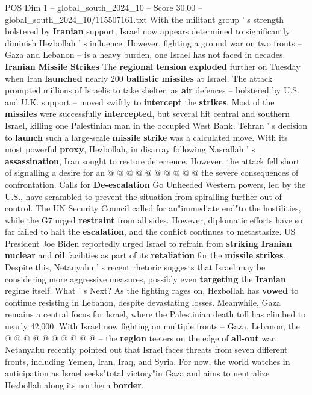 \begin{textsample}{POS Dim 1 – global\_south\_2024\_10 – Score 30.00 – global\_south\_2024\_10/115507161.txt}
With the militant group ' s strength bolstered by \textbf{Iranian} support, Israel now appears determined to significantly diminish Hezbollah ' s influence.
However, fighting a ground war on two fronts -- Gaza and Lebanon -- is a heavy burden, one Israel has not faced in decades. \textbf{Iranian} \textbf{Missile} \textbf{Strikes} The \textbf{regional} \textbf{tension} \textbf{exploded} further on Tuesday when Iran \textbf{launched} nearly 200 \textbf{ballistic} \textbf{missiles} at Israel.
The attack prompted millions of Israelis to take shelter, as \textbf{air} defences -- bolstered by U.S. and U.K. support -- moved swiftly to \textbf{intercept} the \textbf{strikes}.
Most of the \textbf{missiles} were successfully \textbf{intercepted}, but several hit central and southern Israel, killing one Palestinian man in the occupied West Bank.
Tehran ' s decision to \textbf{launch} such a large-scale \textbf{missile} \textbf{strike} was a calculated move.
With its most powerful \textbf{proxy}, Hezbollah, in disarray following Nasrallah ' s \textbf{assassination}, Iran sought to restore deterrence.
However, the attack fell short of signalling a desire for an @ @ @ @ @ @ @ @ @ @ the severe consequences of confrontation.
Calls for \textbf{De-escalation} Go Unheeded Western powers, led by the U.S., have scrambled to prevent the situation from spiralling further out of control.
The UN Security Council called for an"immediate end"to the hostilities, while the G7 urged \textbf{restraint} from all sides.
However, diplomatic efforts have so far failed to halt the \textbf{escalation}, and the conflict continues to metastasize.
US President Joe Biden reportedly urged Israel to refrain from \textbf{striking} \textbf{Iranian} \textbf{nuclear} and \textbf{oil} facilities as part of its \textbf{retaliation} for the \textbf{missile} \textbf{strikes}.
Despite this, Netanyahu ' s recent rhetoric suggests that Israel may be considering more aggressive measures, possibly even \textbf{targeting} the \textbf{Iranian} regime itself.
What ' s Next?
As the fighting rages on, Hezbollah has \textbf{vowed} to continue resisting in Lebanon, despite devastating losses.
Meanwhile, Gaza remains a central focus for Israel, where the Palestinian death toll has climbed to nearly 42,000.
With Israel now fighting on multiple fronts -- Gaza, Lebanon, the @ @ @ @ @ @ @ @ @ @ -- the \textbf{region} teeters on the edge of \textbf{all-out} war.
Netanyahu recently pointed out that Israel faces threats from seven different fronts, including Yemen, Iran, Iraq, and Syria.
For now, the world watches in anticipation as Israel seeks"total victory"in Gaza and aims to neutralize Hezbollah along its northern \textbf{border}.

\end{textsample}
